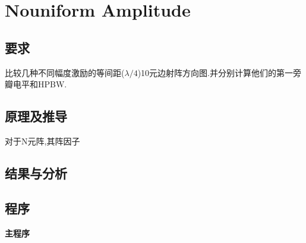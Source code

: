 
\section{Nouniform Amplitude}
\subsection{要求}
\noindent 比较几种不同幅度激励的等间距($\lambda/4$)10元边射阵方向图.并分别计算他们的第一旁瓣电平和HPBW.
\subsection{原理及推导}
对于N元阵,其阵因子

\subsection{结果与分析}

\subsection{程序}
\noindent \textbf{主程序}
\begin{lstlisting}[language={matlab},keywordstyle=\color{blue!70},commentstyle=\color{red!50!green!50!blue!50},frame=shadowbox, rulesepcolor=\color{red!20!green!20!blue!20}] 


\end{lstlisting}
